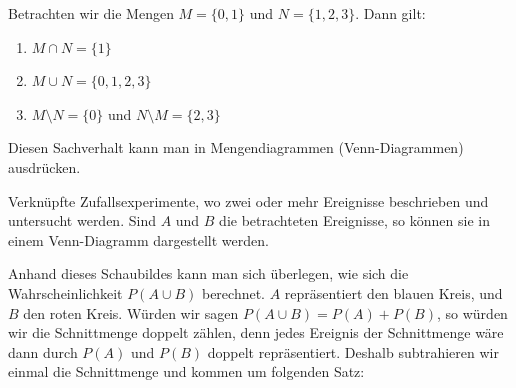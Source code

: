 \documentclass[ngerman, 12pt]{nssheetxea}
\begin{document}
\begin{example}
Betrachten wir die Mengen $M=\{ 0, 1\}$ und $N=\{ 1, 2, 3\}$. Dann gilt:
\begin{enumerate}
\item $M \cap N = \{ 1\}$
\item $M \cup N = \{ 0, 1, 2, 3\}$
\item $M \setminus N =  \{ 0\}$ und $N \setminus M = \{ 2,3\}$
\end{enumerate}
\end{example}

Diesen Sachverhalt kann man in Mengendiagrammen (Venn-Diagrammen) ausdrücken.

\begin{definition}
Verknüpfte Zufallsexperimente, wo zwei oder mehr Ereignisse beschrieben und untersucht werden. Sind $A$ und $B$ die betrachteten Ereignisse, so können sie in einem Venn-Diagramm dargestellt werden. 

\begin{center}
\end{center}
 
\end{definition}

Anhand dieses Schaubildes kann man sich überlegen, wie sich die Wahrscheinlichkeit $P(A\cup B)$ berechnet. $A$ repräsentiert den blauen Kreis, und $B$ den roten Kreis. Würden wir sagen $P(A\cup B)=P(A)+P(B)$, so würden wir die Schnittmenge doppelt zählen, denn jedes Ereignis der Schnittmenge wäre dann durch $P(A)$ und $P(B)$ doppelt repräsentiert. Deshalb subtrahieren wir einmal die Schnittmenge und kommen um folgenden Satz:
\end{document}
